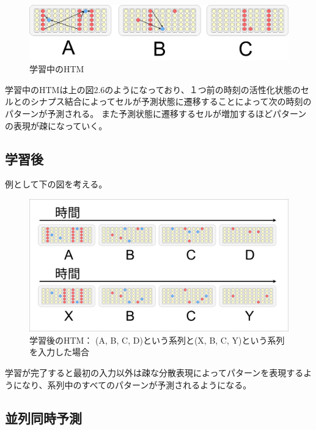 \begin{figure}[ht]
  \begin{center}
    \includegraphics[width=14cm]{./fig/drawing_7}
    \caption{学習中のHTM}
    \label{fig:HTM_during_learning}
  \end{center}
\end{figure}

学習中のHTMは上の図2.6のようになっており、１つ前の時刻の活性化状態のセルとのシナプス結合によってセルが予測状態に遷移することによって次の時刻のパターンが予測される。
また予測状態に遷移するセルが増加するほどパターンの表現が疎になっていく。

\subsection{学習後}
例として下の図を考える。

\begin{figure}[ht]
  \begin{center}
    \includegraphics[width=14cm]{./fig/drawing_6}
    \caption{学習後のHTM： (A, B, C, D)という系列と(X, B, C, Y)という系列を入力した場合}
    \label{fig:HTM_after_learning}
  \end{center}
\end{figure}

学習が完了すると最初の入力以外は疎な分散表現によってパターンを表現するようになり、系列中のすべてのパターンが予測されるようになる。

\newpage
\subsection{並列同時予測}

